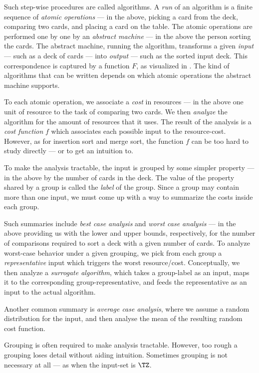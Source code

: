 \documentclass[b5paper, english, oneside]{memoir}
\begin{document}
Such step-wise procedures are called algorithms. A \emph{run} of an algorithm is a finite sequence of \emph{atomic operations} --- in the above, picking a card from the deck, comparing two cards, and placing a card on the table. The atomic operations are performed one by one by an \emph{abstract machine} --- in the above the person sorting the cards. The abstract machine, running the algorithm, transforms a given \emph{input} --- such as a deck of cards --- into \emph{output} --- such as the sorted input deck. This correspondence is captured by a function $F$, as visualized in . The kind of algorithms that can be written depends on which atomic operations the abstract machine supports.

To each atomic operation, we associate a \emph{cost} in resources --- in the above one unit of resource to the task of comparing two cards. We then \emph{analyze} the algorithm for the amount of resources that it uses. The result of the analysis is a \emph{cost function} $f$ which associates each possible input to the resource-cost. However, as for insertion sort and merge sort, the function $f$ can be too hard to study directly --- or to get an intuition to. 

To make the analysis tractable, the input is grouped by some simpler property --- in the above by the number of cards in the deck. The value of the property shared by a group is called the \emph{label} of the group. Since a group may contain more than one input, we must come up with a way to summarize the costs inside each group. 

Such summaries include \emph{best case analysis} and \emph{worst case analysis} --- in the above providing us with the lower and upper bounds, respectively, for the number of comparisons required to sort a deck with a given number of cards. To analyze worst-case behavior under a given grouping, we pick from each group a \emph{representative} input which triggers the worst resource\-/cost. Conceptually, we then analyze a \emph{surrogate algorithm}, which takes a group-label as an input, maps it to the corresponding group-representative, and feeds the representative as an input to the actual algorithm.

Another common summary is \emph{average case analysis}, where we assume a random distribution for the input, and then analyse the mean of the resulting random cost function.

Grouping is often required to make analysis tractable. However, too rough a grouping loses detail without aiding intuition. Sometimes grouping is not necessary at all --- as when the input-set is $\TZ$.
\end{document}
